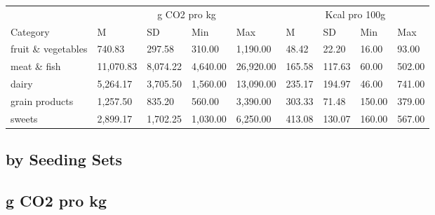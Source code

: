 \documentclass[
  letterpaper,
  DIV=11,
  numbers=noendperiod]{scrartcl}
\begin{document}
\begin{table}
\centering
\begin{tabular}[t]{l|l|l|l|l|l|l|l|l}
\hline
\multicolumn{1}{c|}{ } & \multicolumn{4}{c|}{g CO2 pro kg} & \multicolumn{4}{c}{Kcal pro 100g} \\
\cline{2-5} \cline{6-9}
Category & M & SD & Min & Max & M & SD & Min & Max\\
\hline
fruit \& vegetables & 740.83 & 297.58 & 310.00 & 1,190.00 & 48.42 & 22.20 & 16.00 & 93.00\\
\hline
meat \& fish & 11,070.83 & 8,074.22 & 4,640.00 & 26,920.00 & 165.58 & 117.63 & 60.00 & 502.00\\
\hline
dairy & 5,264.17 & 3,705.50 & 1,560.00 & 13,090.00 & 235.17 & 194.97 & 46.00 & 741.00\\
\hline
grain products & 1,257.50 & 835.20 & 560.00 & 3,390.00 & 303.33 & 71.48 & 150.00 & 379.00\\
\hline
sweets & 2,899.17 & 1,702.25 & 1,030.00 & 6,250.00 & 413.08 & 130.07 & 160.00 & 567.00\\
\hline
\end{tabular}
\end{table}

\subsection{by Seeding Sets}\label{by-seeding-sets}

\subsection{g CO2 pro kg}
\end{document}
